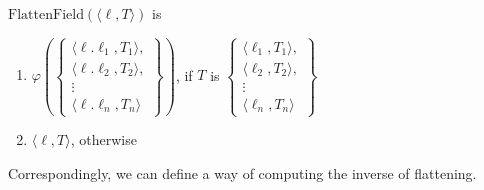 $\mathrm{FlattenField}(\langle\ell, T\rangle)$ is
\begin{enumerate} 
 
\item $\varphi(\left\{\begin{array}{l}\langle\ell.\ell_1, T_1\rangle,\\
                                 \langle\ell.\ell_2, T_2\rangle,\\
                                 \vdots \\
                                 \langle\ell.\ell_n, T_n\rangle
                 \end{array}\right\})$, if $T$ is $\left\{\begin{array}{l}\langle\ell_1, T_1\rangle,\\
                                 \langle\ell_2, T_2\rangle,\\
                                 \vdots \\
                                 \langle\ell_n, T_n\rangle
                 \end{array}\right\}$
 
\item $\langle\ell, T\rangle$, otherwise 
 
\end{enumerate} 
    
Correspondingly, we can define a way of computing the inverse of
flattening.  


